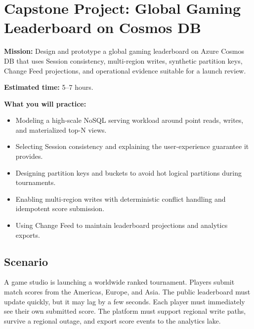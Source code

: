 \section{Capstone Project: Global Gaming Leaderboard on Cosmos DB}\label{sec:ch3-capstone}

\begin{capstonebox}
\textbf{Mission:} Design and prototype a global gaming leaderboard on Azure Cosmos DB that uses Session consistency, multi-region writes, synthetic partition keys, Change Feed projections, and operational evidence suitable for a launch review.

\textbf{Estimated time:} 5--7 hours.

\textbf{What you will practice:}
\begin{itemize}
    \item Modeling a high-scale NoSQL serving workload around point reads, writes, and materialized top-N views.
    \item Selecting Session consistency and explaining the user-experience guarantee it provides.
    \item Designing partition keys and buckets to avoid hot logical partitions during tournaments.
    \item Enabling multi-region writes with deterministic conflict handling and idempotent score submission.
    \item Using Change Feed to maintain leaderboard projections and analytics exports.
\end{itemize}
\end{capstonebox}

\subsection*{Scenario}
A game studio is launching a worldwide ranked tournament. Players submit match scores from the Americas, Europe, and Asia. The public leaderboard must update quickly, but it may lag by a few seconds. Each player must immediately see their own submitted score. The platform must support regional write paths, survive a regional outage, and export score events to the analytics lake.

